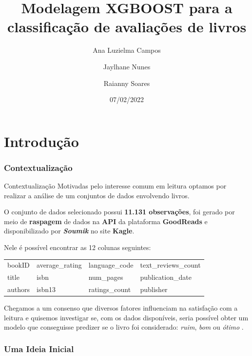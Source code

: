 \documentclass[
  9 pt,
  ignorenonframetext,
]{beamer}
\title{Modelagem XGBOOST para a classificação de avaliações de livros}
\author{Ana Luzielma Campos \newline \and Jaylhane Nunes
\newline \and Raianny Soares}
\date{07/02/2022}
\begin{document}
\frame{\titlepage}

\hypertarget{introduuxe7uxe3o}{%
\section{Introdução}\label{introduuxe7uxe3o}}

\hypertarget{contextualizauxe7uxe3o}{%
\subsubsection{Contextualização}\label{contextualizauxe7uxe3o}}

\begin{frame}{Contextualização}
Motivadas pelo interesse comum em leitura optamos por realizar a análise
de um conjuntos de dados envolvendo livros.

O conjunto de dados selecionado possui \textbf{11.131 observações}, foi
gerado por meio de \textbf{raspagem} de dados na \textbf{API} da
plataforma \textbf{GoodReads} e disponibilizado por
\textbf{\emph{Soumik}} no site \textbf{Kagle}.

Nele é possível encontrar as 12 colunas seguintes:

\begin{table}[H]
\centering
\begin{tabular}{llll}
\toprule
bookID & average\_rating & language\_code & text\_reviews\_count\\
title & isbn & num\_pages & publication\_date\\
authors & isbn13 & ratings\_count & publisher\\
\bottomrule
\end{tabular}
\end{table}

Chegamos a um consenso que diversos fatores influenciam na satisfação
com a leitura e quisemos investigar se, com os dados disponíveis, seria
possível obter um modelo que conseguisse predizer se o livro foi
considerado: \emph{ruim}, \emph{bom} ou \emph{ótimo} .
\end{frame}

\hypertarget{uma-ideia-inicial}{%
\subsubsection{Uma Ideia Inicial}\label{uma-ideia-inicial}}
\end{document}
